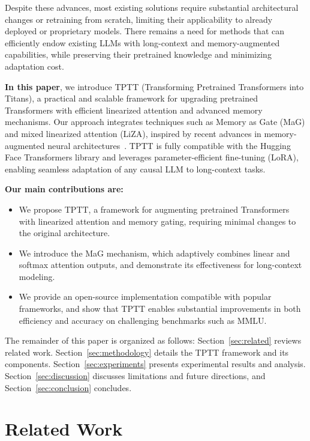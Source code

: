 \documentclass[10pt,a4paper]{article}
\begin{document}
Despite these advances, most existing solutions require substantial architectural changes or retraining from scratch, limiting their applicability to already deployed or proprietary models. There remains a need for methods that can efficiently endow existing LLMs with long-context and memory-augmented capabilities, while preserving their pretrained knowledge and minimizing adaptation cost.

\textbf{In this paper}, we introduce TPTT (Transforming Pretrained Transformers into Titans), a practical and scalable framework for upgrading pretrained Transformers with efficient linearized attention and advanced memory mechanisms. Our approach integrates techniques such as Memory as Gate (MaG) and mixed linearized attention (LiZA), inspired by recent advances in memory-augmented neural architectures~\cite{behrouz2024titans}. TPTT is fully compatible with the Hugging Face Transformers library and leverages parameter-efficient fine-tuning (LoRA), enabling seamless adaptation of any causal LLM to long-context tasks.


\textbf{Our main contributions are:}


\begin{itemize}
    \item We propose TPTT, a framework for augmenting pretrained Transformers with linearized attention and memory gating, requiring minimal changes to the original architecture.
    \item We introduce the MaG mechanism, which adaptively combines linear and softmax attention outputs, and demonstrate its effectiveness for long-context modeling.
    \item We provide an open-source implementation compatible with popular frameworks, and show that TPTT enables substantial improvements in both efficiency and accuracy on challenging benchmarks such as MMLU.
\end{itemize}

The remainder of this paper is organized as follows: Section~\ref{sec:related} reviews related work. Section~\ref{sec:methodology} details the TPTT framework and its components. Section~\ref{sec:experiments} presents experimental results and analysis. Section~\ref{sec:discussion} discusses limitations and future directions, and Section~\ref{sec:conclusion} concludes.


\section{Related Work}
\end{document}
